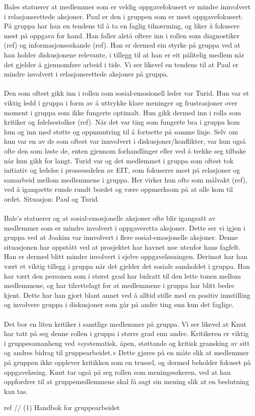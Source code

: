 Bales statuerer at medlemmer som er veldig oppgavefokusert er mindre innvolvert 
i relasjonsrettede aksjoner. Paul er den i gruppen som er mest oppgavefokusert. 
På gruppa har han en tendens til å ta en faglig tilnærming, og liker å fokusere 
mest på oppgava for hand. Han faller alstå oftere inn i rollen som diagnostiker 
(ref) og informasjonssøkande (ref). Han er dermed ein styrke på gruppa ved at han 
holder diskusjonene relevante, i tillegg til at han er eit pålitelig medlem når 
det gjelder å gjennomføre arbeid i tide. Vi ser likevel en tendens til at Paul 
er mindre involvert i relasjonsrettede aksjoner på gruppa.
\\
\\
Den som oftest gikk inn i rollen som sosial-emosionell leder var Turid. Hun var et 
viktig ledd i gruppa i form av å uttrykke klare meninger og frustrasjoner over 
moment i gruppa som ikke fungerte optimalt. Hun gikk dermed inn i rolla som kritiker 
og følelsestolker (ref). Når det var ting som fungerte bra i gruppa kom hun og inn 
med støtte og oppmuntring til å fortsette på samme linje. Selv om hun var en av de 
som oftest var innvolvert i diskusjoner/konflikter, var hun også ofte den som løste de, 
enten gjennom forhandlinger eller ved å trekke seg tilbake når hun gikk for langt. 
Turid var og det medlemmet i gruppa som oftest tok initiativ og ledelse i prossessdelen av EIT, 
som fokuserer mest på relasjoner og samarbeid mellom medlemmene i gruppa. Her virker hun 
ofte som målvakt (ref), ved å igangsette runde rundt bordet og være oppmerksom på at alle kom til ordet.
Situasjon: Paul og Turid.
\\
\\
Bale's statuerer og at sosial-emosjonelle aksjoner ofte blir igangsatt av medlemmer som er 
mindre involvert i oppgaveretta aksjoner. Dette ser vi igjen i gruppa ved at Joakim var 
innvolvert i flere sosial-emosjonelle aksjoner. Denne situasjonen har oppstått ved at 
prosjektet har havnet noe utenfor hans fagfelt. Han er dermed blitt mindre involvert i 
sjelve oppgaveløsningen. Derimot har han vært et viktig tillegg i gruppa når det gjelder 
det sosiale samholdet i gruppa. Han har vært den personen som i størst grad har bidratt 
til den lette tonen mellom medlemmene, og har tilrettelagt for at medlemmene i gruppa har 
blitt bedre kjent. Dette har han gjort blant annet ved å alltid stille med en positiv 
innstilling og involvere gruppa i diskusjoner som går på andre ting enn kun det faglige.
\\
\\
Det bor en liten kritiker i samtlige medlemmer på gruppa. Vi ser likevel at Knut har tatt 
på seg denne rollen i gruppa i større grad enn andre. Kritikeren er viktig i gruppesamanheng 
ved «systematisk, åpen, støttande og kritisk gransking av sitt og andres bidrag til gruppearbeidet.»
Dette gjøres på en måte slik at medlemmer på gruppen ikke opplever kritikken som en trussel, 
og dermed beholder fokuset på oppgaveløsing. Knut tar også på seg rollen som meningssøkeren, 
ved at han oppfordrer til at gruppemedlemmene skal få sagt sin mening slik at en beslutning
kan tas.

ref // (1) Handbok for gruppearbeidet
